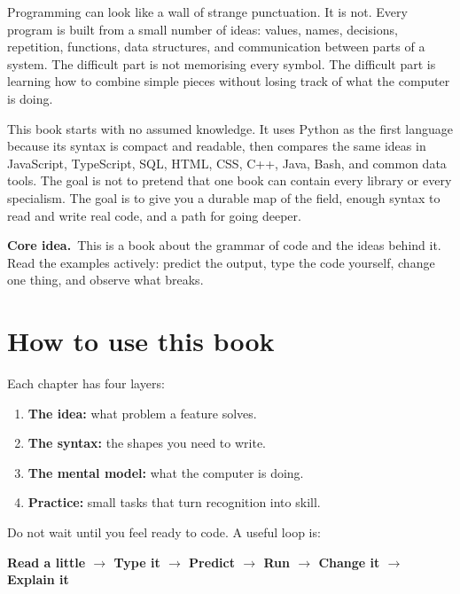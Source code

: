 \documentclass[11pt,openany,oneside]{book}
\newcommand{\keyidea}{\textsf{\bfseries\color{teal}Core idea.}\ }
\begin{document}
Programming can look like a wall of strange punctuation. It is not. Every program is built from a small number of ideas: values, names, decisions, repetition, functions, data structures, and communication between parts of a system. The difficult part is not memorising every symbol. The difficult part is learning how to combine simple pieces without losing track of what the computer is doing.

This book starts with no assumed knowledge. It uses Python as the first language because its syntax is compact and readable, then compares the same ideas in JavaScript, TypeScript, SQL, HTML, CSS, C++, Java, Bash, and common data tools. The goal is not to pretend that one book can contain every library or every specialism. The goal is to give you a durable map of the field, enough syntax to read and write real code, and a path for going deeper.

\begin{keybox}
\keyidea This is a book about the grammar of code and the ideas behind it. Read the examples actively: predict the output, type the code yourself, change one thing, and observe what breaks.
\end{keybox}

\chapter*{How to use this book}

Each chapter has four layers:

\begin{enumerate}
  \item \textbf{The idea:} what problem a feature solves.
  \item \textbf{The syntax:} the shapes you need to write.
  \item \textbf{The mental model:} what the computer is doing.
  \item \textbf{Practice:} small tasks that turn recognition into skill.
\end{enumerate}

Do not wait until you feel ready to code. A useful loop is:

\begin{center}
\sffamily\bfseries\color{teal}Read a little \quad $\rightarrow$ \quad Type it \quad $\rightarrow$ \quad Predict \quad $\rightarrow$ \quad Run \quad $\rightarrow$ \quad Change it \quad $\rightarrow$ \quad Explain it
\end{center}
\end{document}
